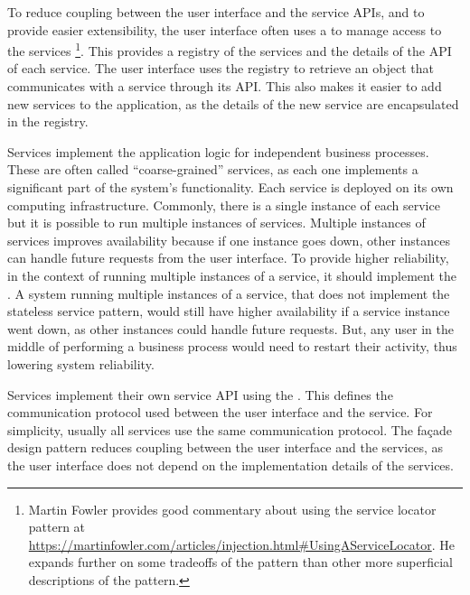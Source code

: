 To reduce coupling between the user interface and the service APIs, and to provide easier extensibility, the user interface often uses a
 to manage access to the services%
\footnote{Martin Fowler provides good commentary about using the service locator pattern at \url{https://martinfowler.com/articles/injection.html#UsingAServiceLocator}.
He expands further on some tradeoffs of the pattern than other more superficial descriptions of the pattern.}.
This provides a registry of the services and the details of the API of each service.
The user interface uses the registry to retrieve an object that communicates with a service through its API.
This also makes it easier to add new services to the application, as the details of the new service are encapsulated in the registry.

Services implement the application logic for independent business processes.
These are often called ``coarse-grained'' services, as each one implements a significant part of the system's functionality.
Each service is deployed on its own computing infrastructure.
Commonly, there is a single instance of each service but it is possible to run multiple instances of services.
Multiple instances of services improves availability because if one instance goes down, other instances can handle future requests from the user interface.
To provide higher reliability, in the context of running multiple instances of a service, it should implement the
.
A system running multiple instances of a service, that does not implement the stateless service pattern,
would still have higher availability if a service instance went down, as other instances could handle future requests.
But, any user in the middle of performing a business process would need to restart their activity, thus lowering system reliability.

Services implement their own service API using the .
This defines the communication protocol used between the user interface and the service.
For simplicity, usually all services use the same communication protocol.
The façade design pattern reduces coupling between the user interface and the services,
as the user interface does not depend on the implementation details of the services.

